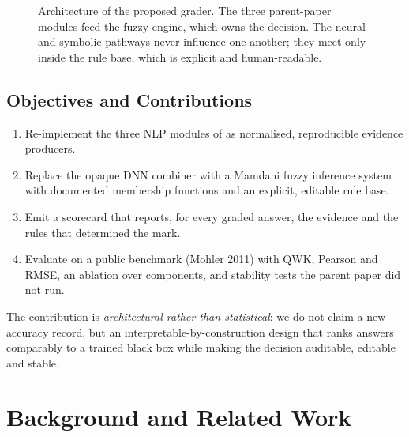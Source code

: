 \documentclass[11pt,a4paper]{article}
\begin{document}
\begin{figure}[!ht]
\caption{Architecture of the proposed grader. The three parent-paper modules feed
the fuzzy engine, which owns the decision. The neural and symbolic pathways never
influence one another; they meet only inside the rule base, which is explicit and
human-readable.}
\label{fig:arch}
\end{figure}

\subsection{Objectives and Contributions}

\begin{enumerate}[leftmargin=1.4em,itemsep=0.15em]
  \item Re-implement the three NLP modules of \cite{agrawal2024} as normalised,
  reproducible evidence producers.
  \item Replace the opaque DNN combiner with a Mamdani fuzzy inference system with
  documented membership functions and an explicit, editable rule base.
  \item Emit a scorecard that reports, for every graded answer, the evidence and
  the rules that determined the mark.
  \item Evaluate on a public benchmark (Mohler 2011) with QWK, Pearson and RMSE,
  an ablation over components, and stability tests the parent paper did not run.
\end{enumerate}

\noindent The contribution is \emph{architectural rather than statistical}: we do
not claim a new accuracy record, but an interpretable-by-construction design that
ranks answers comparably to a trained black box while making the decision
auditable, editable and stable.

\newpage

\section{Background and Related Work}
\end{document}
